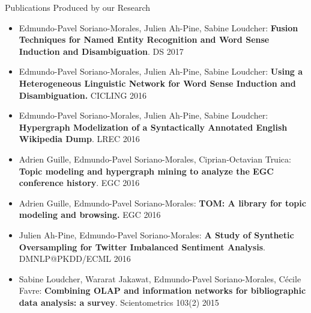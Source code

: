 \documentclass[10pt,=table]{beamer}
\begin{document}
\begin{frame}{Publications Produced by our Research}
\begin{itemize}
	\item \footnotesize Edmundo-Pavel Soriano-Morales, Julien Ah-Pine, Sabine Loudcher: \textbf{Fusion Techniques for Named Entity Recognition and Word Sense Induction and Disambiguation}. DS 2017
	\item \footnotesize Edmundo-Pavel Soriano-Morales, Julien Ah-Pine, Sabine Loudcher:
	\textbf{Using a Heterogeneous Linguistic Network for Word Sense Induction and Disambiguation.} CICLING 2016
	\item \footnotesize Edmundo-Pavel Soriano-Morales, Julien Ah-Pine, Sabine Loudcher:
		\textbf{Hypergraph Modelization of a Syntactically Annotated English Wikipedia Dump}. LREC 2016
	\item \footnotesize Adrien Guille, Edmundo-Pavel Soriano-Morales, Ciprian-Octavian Truica:
\textbf{Topic modeling and hypergraph mining to analyze the EGC conference history}. EGC 2016
\item \footnotesize Adrien Guille, Edmundo-Pavel Soriano-Morales:
\textbf{TOM: A library for topic modeling and browsing.} EGC 2016
\item \footnotesize Julien Ah-Pine, Edmundo-Pavel Soriano-Morales: \textbf{A Study of Synthetic Oversampling for Twitter Imbalanced Sentiment Analysis}. DMNLP@PKDD/ECML 2016

\item \footnotesize Sabine Loudcher, Wararat Jakawat, Edmundo-Pavel Soriano-Morales, C\'{e}cile Favre:	\textbf{Combining OLAP and information networks for bibliographic data analysis: a survey}. Scientometrics 103(2) 2015
\end{itemize}
\end{frame}

{
    \nointerlineskip
}
\end{document}
